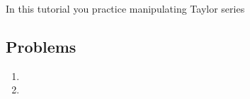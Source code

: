 		\begin{objectives}
			In this tutorial you practice manipulating Taylor series
		\end{objectives}

\subsection*{Problems}

\begin{enumerate}
	\item %

	\item %
		
\end{enumerate}
